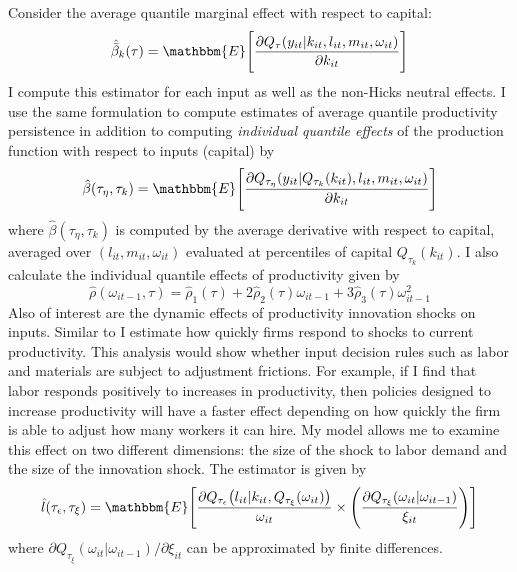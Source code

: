 \documentclass{article}
\begin{document}
Consider the average quantile marginal effect with respect to capital:
\begin{equation*}
\hat{\bar{\beta}}_{k}(\tau)=\mathbbm{E}\Bigg[\frac{\partial Q_{\tau}(y_{it}|k_{it}, l_{it}, m_{it}, \omega_{it})}{\partial k_{it}}\Bigg]
\end{equation*}
I compute this estimator for each input as well as the non-Hicks neutral effects. I use the same formulation to compute estimates of average quantile productivity persistence in addition to computing \textit{individual quantile effects} of the production function with respect to inputs (capital) by
\begin{equation*}
\hat{\beta}(\tau_{\eta}, \tau_{k})=\mathbbm{E}\Bigg[\frac{\partial Q_{\tau_{\eta}}(y_{it}|Q_{\tau_{k}}(k_{it}), l_{it}, m_{it}, \omega_{it})}{\partial k_{it}}\Bigg]
\end{equation*}
where $\hat{\beta}(\tau_{\eta}, \tau_{k})$ is computed by the average derivative with respect to capital, averaged over $(l_{it},m_{it},\omega_{it})$ evaluated at percentiles of capital $Q_{\tau_{k}}(k_{it})$. I also calculate the individual quantile effects of productivity given by
\begin{equation*}
\hat{\rho}(\omega_{it-1},\tau)=\hat{\rho}_{1}(\tau)+2\hat{\rho}_{2}(\tau)\omega_{it-1}+3\hat{\rho}_{3}(\tau)\omega^{2}_{it-1}
\end{equation*}
Also of interest are the dynamic effects of productivity innovation shocks on inputs. Similar to \cite{Hu2019} I estimate how quickly firms respond to shocks to current productivity. This analysis would show whether input decision rules such as labor and materials are subject to adjustment frictions. For example, if I find that labor responds positively to increases in productivity, then policies designed to increase productivity will have a faster effect depending on how quickly the firm is able to adjust how many workers it can hire. My model allows me to examine this effect on two different dimensions: the size of the shock to labor demand and the size of the innovation shock. The estimator is given by 
\begin{equation*}
\hat{l}(\tau_{\epsilon}, \tau_{\xi})=\mathbbm{E}\Bigg[\frac{\partial Q_{\tau_{\epsilon}}\big(l_{it}|k_{it},Q_{\tau_{\xi}}(\omega_{it})\big)}{\omega_{it}}\times\Bigg(\frac{\partial Q_{\tau_{\xi}}(\omega_{it}|\omega_{it-1})}{\xi_{it}}\Bigg)\Bigg]
\end{equation*}
where $\partial Q_{\tau_{\xi}}(\omega_{it}|\omega_{it-1})/\partial \xi_{it}$ can be approximated by finite differences.
\end{document}

